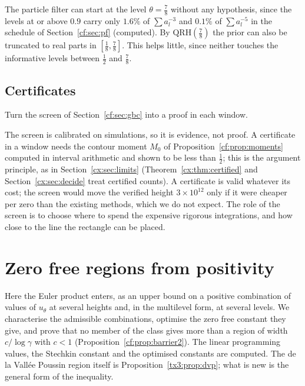 The particle filter can start at the level $\theta=\frac78$ without any hypothesis, since the levels at or above $0.9$ carry only $1.6\%$ of $\sum a_l^{-3}$ and $0.1\%$ of $\sum a_l^{-5}$ in the schedule of Section~\ref{cf:sec:pf} (computed). By $\mathrm{QRH}(\frac78)$ the prior can also be truncated to real parts in $[\frac18,\frac78]$. This helps little, since neither touches the informative levels between $\frac12$ and $\frac78$.

\subsection{Certificates}

\begin{problem}\label{cf:op:certificate}
Turn the screen of Section~\ref{cf:sec:gbc} into a proof in each window.
\end{problem}

The screen is calibrated on simulations, so it is evidence, not proof. A certificate in a window needs the contour moment $M_0$ of Proposition~\ref{cf:prop:moments} computed in interval arithmetic and shown to be less than $\frac12$; this is the argument principle, as in Section~\ref{cx:sec:limits} (Theorem~\ref{cx:thm:certified} and Section~\ref{cx:sec:decide} treat certified counts). A certificate is valid whatever its cost; the screen would move the verified height $3\times10^{12}$ \cite{PT21} only if it were cheaper per zero than the existing methods, which we do not expect. The role of the screen is to choose where to spend the expensive rigorous integrations, and how close to the line the rectangle can be placed.

\section{Zero free regions from positivity}\label{cf:sec:arith}

Here the Euler product enters, as an upper bound on a positive combination of values of $u_\theta$ at several heights and, in the multilevel form, at several levels. We characterise the admissible combinations, optimise the zero free constant they give, and prove that no member of the class gives more than a region of width $c/\log\gamma$ with $c<1$ (Proposition~\ref{cf:prop:barrier2}). The linear programming values, the Stechkin constant and the optimised constants are computed. The de la Vall\'ee Poussin region itself is Proposition~\ref{tx3:prop:dvp}; what is new is the general form of the inequality.

